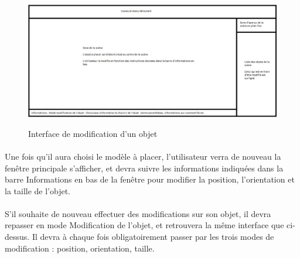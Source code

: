 \begin{figure}[h]
  \centering
  \includegraphics[scale=0.5]{interfacemodifs}
  \label{fig:interfacemodifs}
  \caption{Interface de modification d'un objet}
\end{figure}

\paragraph{}
Une fois qu’il aura choisi le modèle à placer, l’utilisateur verra de nouveau la fenêtre principale s’afficher, et devra suivre les informations indiquées dans la barre Informations en bas de la fenêtre pour modifier la position, l’orientation et la taille de l’objet.

\paragraph{}
S’il souhaite de nouveau effectuer des modifications sur son objet, il devra repasser en mode Modification de l’objet, et retrouvera la même interface que ci-dessus. Il devra à chaque fois obligatoirement passer par les trois modes de modification : position, orientation, taille.
